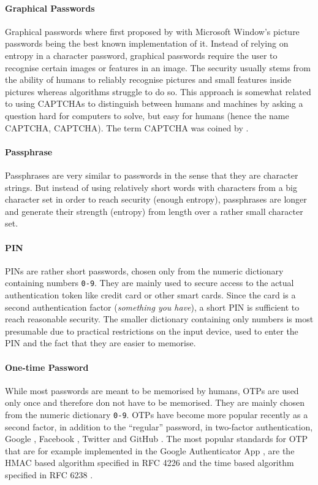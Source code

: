 \paragraph{Graphical Passwords}
Graphical passwords where first proposed by \citet{Blonder96} with Microsoft Window's picture passwords \cite{picturepwd1,picturepwd2} being the best known implementation of it.
Instead of relying on entropy in a character password, graphical passwords require the user to recognise certain images or features in an image.
The security usually stems from the ability of humans to reliably recognise pictures and small features inside pictures whereas algorithms struggle to do so.
This approach is somewhat related to using \acsp{CAPTCHA} to distinguish between humans and machines by asking a question hard for computers to solve, but easy for humans (hence the name \ac{CAPTCHA}, \acl{CAPTCHA}).
The term \ac{CAPTCHA} was coined by \citet{AhnBHL03}.

\paragraph{Passphrase}
Passphrases are very similar to passwords in the sense that they are character strings.
But instead of using relatively short words with characters from a big character set in order to reach security (enough entropy), passphrases are longer and generate their strength (entropy) from length over a rather small character set.

\paragraph{\acl{PIN}}
\acp{PIN} are rather short passwords, chosen only from the numeric dictionary containing numbers \texttt{0-9}.
They are mainly used to secure access to the actual authentication token like credit card or other smart cards.
Since the card is a second authentication factor (\emph{something you have}), a short \ac{PIN} is sufficient to reach reasonable security.
The smaller dictionary containing only numbers is most presumable due to practical restrictions on the input device, used to enter the \ac{PIN} and the fact that they are easier to memorise.

\paragraph{One-time Password}
While most passwords are meant to be memorised by humans, \acp{OTP} are used only once and therefore don not have to be memorised.
They are mainly chosen from the numeric dictionary \texttt{0-9}.
\acp{OTP} have become more popular recently as a second factor, in addition to the ``regular'' password, in two-factor authentication, \eg Google \cite{Google2Factor}, Facebook \cite{FB2Factor}, Twitter \cite{Twitter2Factor} and GitHub \cite{Github2Factor}.
The most popular standards for \ac{OTP} that are for example implemented in the Google Authenticator App \cite{GAuthenticator}, are the \acs{HMAC} based algorithm specified in RFC 4226 \cite{rfc4226} and the time based algorithm specified in RFC 6238 \cite{rfc6238}.

